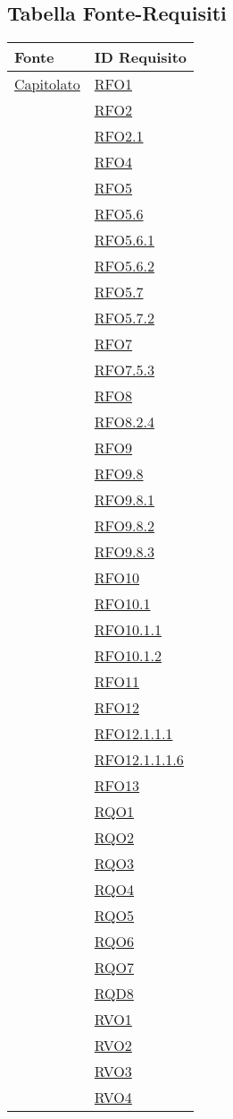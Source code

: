\newpage
\subsection{Tabella Fonte-Requisiti}
\normalsize
\begin{longtable}{|>{\centering}m{5cm}|m{5cm}<{\centering}|}
\hline 
\textbf{Fonte} & \textbf{ID Requisito}\\
\hline
\endhead
\hyperlink{Capitolato}{Capitolato}
& \hyperlink{RFO1}{RFO1}\\
& \hyperlink{RFO2}{RFO2}\\
& \hyperlink{RFO2.1}{RFO2.1}\\
& \hyperlink{RFO4}{RFO4}\\
& \hyperlink{RFO5}{RFO5}\\
& \hyperlink{RFO5.6}{RFO5.6}\\
& \hyperlink{RFO5.6.1}{RFO5.6.1}\\
& \hyperlink{RFO5.6.2}{RFO5.6.2}\\
& \hyperlink{RFO5.7}{RFO5.7}\\
& \hyperlink{RFO5.7.2}{RFO5.7.2}\\
& \hyperlink{RFO7}{RFO7}\\
& \hyperlink{RFO7.5.3}{RFO7.5.3}\\
& \hyperlink{RFO8}{RFO8}\\
& \hyperlink{RFO8.2.4}{RFO8.2.4}\\
& \hyperlink{RFO9}{RFO9}\\
& \hyperlink{RFO9.8}{RFO9.8}\\
& \hyperlink{RFO9.8.1}{RFO9.8.1}\\
& \hyperlink{RFO9.8.2}{RFO9.8.2}\\
& \hyperlink{RFO9.8.3}{RFO9.8.3}\\
& \hyperlink{RFO10}{RFO10}\\
& \hyperlink{RFO10.1}{RFO10.1}\\
& \hyperlink{RFO10.1.1}{RFO10.1.1}\\
& \hyperlink{RFO10.1.2}{RFO10.1.2}\\
& \hyperlink{RFO11}{RFO11}\\
& \hyperlink{RFO12}{RFO12}\\
& \hyperlink{RFO12.1.1.1}{RFO12.1.1.1}\\
& \hyperlink{RFO12.1.1.1.6}{RFO12.1.1.1.6}\\
& \hyperlink{RFO13}{RFO13}\\
& \hyperlink{RQO1}{RQO1}\\
& \hyperlink{RQO2}{RQO2}\\
& \hyperlink{RQO3}{RQO3}\\
& \hyperlink{RQO4}{RQO4}\\
& \hyperlink{RQO5}{RQO5}\\
& \hyperlink{RQO6}{RQO6}\\
& \hyperlink{RQO7}{RQO7}\\
& \hyperlink{RQD8}{RQD8}\\
& \hyperlink{RVO1}{RVO1}\\
& \hyperlink{RVO2}{RVO2}\\
& \hyperlink{RVO3}{RVO3}\\
& \hyperlink{RVO4}{RVO4}\\


\end{longtable}
